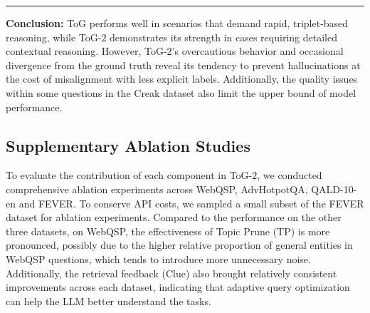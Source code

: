 \documentclass{article} %
\begin{document}
\rule{\textwidth}{0.5pt}

\textbf{Conclusion:} ToG performs well in scenarios that demand rapid, triplet-based reasoning, while ToG-$2$ demonstrates its strength in cases requiring detailed contextual reasoning. However, ToG-$2$’s overcautious behavior and occasional divergence from the ground truth reveal its tendency to prevent hallucinations at the cost of misalignment with less explicit labels. Additionally, the quality issues within some questions in the Creak dataset also limit the upper bound of model performance.


\subsection{Supplementary Ablation Studies}
\label{apd:abl}
To evaluate the contribution of each component in ToG-$2$, we conducted comprehensive ablation experiments across WebQSP, AdvHotpotQA, QALD-10-en and FEVER. To conserve API costs, we sampled a small subset of the FEVER dataset for ablation experiments.
Compared to the performance on the other three datasets, on WebQSP, the effectiveness of Topic Prune (TP) is more pronounced, possibly due to the higher relative proportion of general entities in WebQSP questions, which tends to introduce more unnecessary noise. 
Additionally, the retrieval feedback (Clue) also brought relatively consistent improvements across each dataset, indicating that adaptive query optimization can help the LLM better understand the tasks. 


\begin{table}[th]
    \centering
    \renewcommand{\arraystretch}{1.3}
    \caption{Influence of each module in ToG-$2$ on the final performance. / denote without. $Clue$: the retrieval feedback. $TP$: topic prune. /$RC$: replace relation prune Eq.\ref{Eq3} with Eq.\ref{Eq2}. }
    \vspace{-0.3cm}
    \label{tab:abl}
\end{table}
\end{document}
